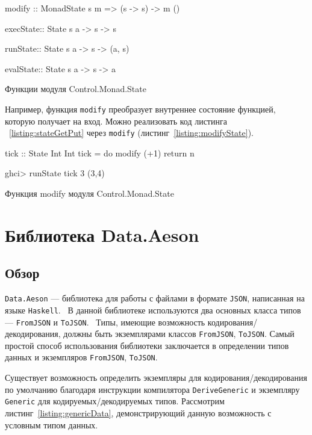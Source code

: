 \begin{ListingEnv}[H]
\begin{Verb}
modify :: MonadState s m => (s -> s) -> m ()

execState:: State s a -> s -> s

runState:: State s a -> s -> (a, s)

evalState:: State s a -> s -> a
\end{Verb}
\caption{Функции модуля Control.Monad.State}
\label{listing:stateFunc}
\end{ListingEnv}

Например, функция \lstinline{modify} преобразует внутреннее состояние функцией, которую получает на вход. Можно реализовать код листинга ~\ref{listing:stateGetPut} через \lstinline{modify} (листинг~\ref{listing:modifyState}).

\begin{ListingEnv}[H]
\begin{Verb}
tick :: State Int Int
tick = do modify (+1)
          return n

ghci> runState tick 3
(3,4)
\end{Verb}
\caption{Функция modify модуля Control.Monad.State}
\label{listing:modifyState}
\end{ListingEnv}
	
\section{Библиотека Data.Aeson}
\label{sec:secAeson}

\subsection{Обзор}

\lstinline{Data.Aeson} --- библиотека для работы с файлами в формате \lstinline{JSON}, написанная на языке \lstinline{Haskell}.~\cite{aeson} В данной  библиотеке используются два основных класса типов --- \lstinline{FromJSON} и \lstinline{ToJSON}.~\cite{aesonEx} Типы, имеющие возможность кодирования/декодирования, должны быть экземплярами классов \lstinline{FromJSON}, \lstinline{ToJSON}. Самый простой способ использования библиотеки заключается в определении типов данных и экземпляров \lstinline{FromJSON}, \lstinline{ToJSON}. 

Существует возможность определить экземпляры для кодирования/декодирования по умолчанию благодаря инструкции компилятора \lstinline{DeriveGeneric} и экземпляру \lstinline{Generic} для кодируемых/декодируемых типов. Рассмотрим листинг~\ref{listing:genericData}, демонстрирующий данную возможность с условным типом данных. 


